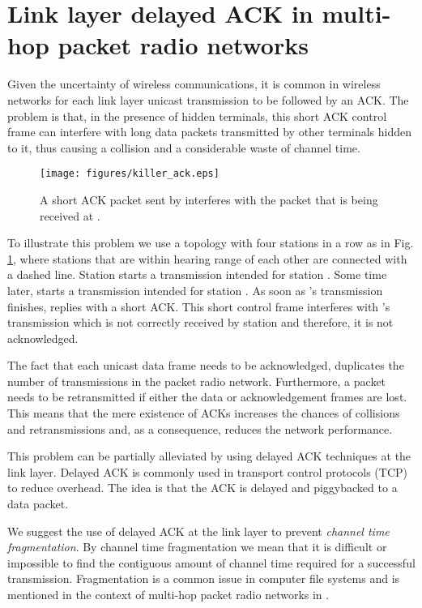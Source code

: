 \documentclass[twocolumn]{svjour3}          \smartqed  \usepackage{graphicx}
\begin{document}
\section{Link layer delayed ACK in multi-hop packet radio networks}
\label{sec:delayed_ack}

Given the uncertainty of wireless communications, it is common in wireless networks for each link layer unicast transmission to be followed by an ACK.
The problem is that, in the presence of hidden terminals, this short ACK control frame can interfere with long data packets transmitted by other terminals hidden to it, thus causing a collision and a considerable waste of channel time.

\begin{figure}
\centering
  \texttt{[image: figures/killer\_ack.eps]}
\caption{A short ACK packet sent by  interferes with the packet that is being received at .}
\label{fig:killer_ack}
\end{figure}

To illustrate this problem we use a topology with four stations in a row as in Fig. \ref{fig:killer_ack}, where stations that are within hearing range of each other are connected with a dashed line.
Station  starts a transmission intended for station .
Some time later,  starts a transmission intended for station .
As soon as 's transmission finishes,  replies with a short ACK.
This short control frame interferes with 's transmission which is not correctly received by station  and therefore, it is not acknowledged.

The fact that each unicast data frame needs to be acknowledged, duplicates the number of transmissions in the packet radio network.
Furthermore, a packet needs to be retransmitted if either the data or acknowledgement frames are lost.
This means that the mere existence of ACKs increases the chances of collisions and retransmissions and, as a consequence, reduces the network performance.

This problem can be partially alleviated by using delayed ACK techniques at the link layer.
Delayed ACK is commonly used in transport control protocols (TCP) to reduce overhead.
The idea is that the ACK is delayed and piggybacked to a data packet.

We suggest the use of delayed ACK at the link layer to prevent \emph{channel time fragmentation}.
By channel time fragmentation we mean that it is difficult or impossible to find the contiguous amount of channel time required for a successful transmission.
Fragmentation is a common issue in computer file systems and is mentioned in the context of multi-hop packet radio networks in \cite{cicconetti2008sdr}.
\end{document}

